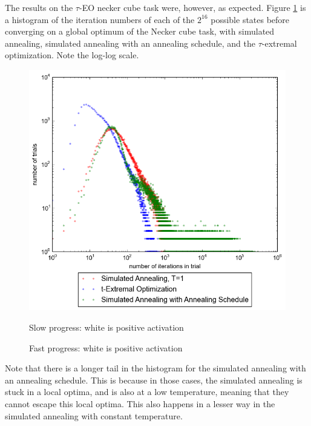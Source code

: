 \documentclass[12pt]{article}
\begin{document}
The results on the $\tau$-EO necker cube task were, however, as expected. Figure \ref{fig:speed} is a histogram of the iteration numbers of each of the $2^16$ possible states before converging on a global optimum of the Necker cube task, with simulated annealing, simulated annealing with an annealing schedule, and the $\tau$-extremal optimization. Note the log-log scale.

\begin{figure}
  \label{fig:speed}
  \includegraphics{iter_hist}
\end{figure}

\begin{figure}
  \label{fig:slow_progess}
  \caption{Slow progress: white is positive activation}
\end{figure}
\begin{figure}
  \label{fig:fast_progess}
  \caption{Fast progress: white is positive activation}
\end{figure}

Note that there is a longer tail in the histogram for the simulated annealing with an annealing schedule. This is because in those cases, the simulated annealing is stuck in a local optima, and is also at a low temperature, meaning that they cannot escape this local optima. This also happens in a lesser way in the simulated annealing with constant temperature.
\end{document}
